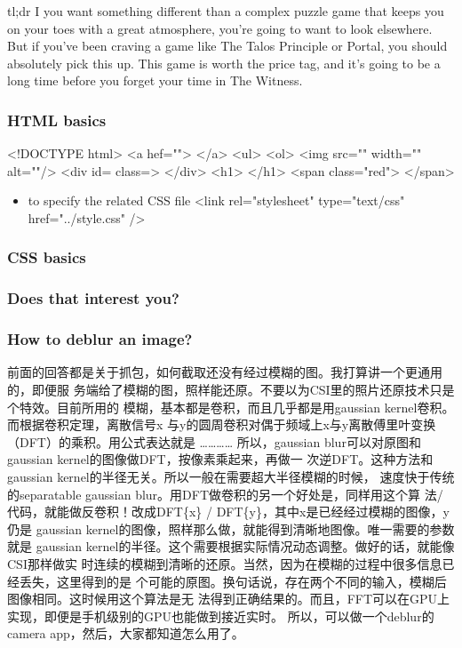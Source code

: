 \documentclass[11pt]{article}
\begin{document}
\begin{itemize}
\begin{itemize}
tl;dr I you want something different than a complex puzzle game that keeps you
on your toes with a great atmosphere, you're going to want to look elsewhere.
But if you've been craving a game like The Talos Principle or Portal, you should
absolutely pick this up. This game is worth the price tag, and it's going to be
a long time before you forget your time in The Witness.
\end{itemize}
\end{itemize}

\subsubsection*{HTML basics}
\label{sec:orgheadline61}
<!DOCTYPE html>
<a hef=""> </a>
<ul>
<ol>
<img src="" width="" alt=""/>
<div id= class=> </div>
<h1> </h1>
<span class="red"> </span>

\begin{itemize}
\item to specify the related CSS file
\label{sec:orgheadline60}
<link rel="stylesheet" type="text/css" href="../style.css" />
\end{itemize}
\subsubsection*{CSS basics}
\label{sec:orgheadline62}

\subsubsection*{Does that \textbf{interest} you?}
\label{sec:orgheadline63}

\subsubsection*{How to deblur an image?}
\label{sec:orgheadline64}

前面的回答都是关于抓包，如何截取还没有经过模糊的图。我打算讲一个更通用的，即便服
务端给了模糊的图，照样能还原。不要以为CSI里的照片还原技术只是个特效。目前所用的
模糊，基本都是卷积，而且几乎都是用gaussian kernel卷积。而根据卷积定理，离散信号x
与y的圆周卷积对偶于频域上x与y离散傅里叶变换（DFT）的乘积。用公式表达就是
\ldots{}\ldots{}\ldots{}\ldots{}
所以，gaussian blur可以对原图和gaussian kernel的图像做DFT，按像素乘起来，再做一
次逆DFT。这种方法和gaussian kernel的半径无关。所以一般在需要超大半径模糊的时候，
速度快于传统的separatable gaussian blur。用DFT做卷积的另一个好处是，同样用这个算
法/代码，就能做反卷积！改成DFT\{x\} / DFT\{y\}，其中x是已经经过模糊的图像，y仍是
gaussian kernel的图像，照样那么做，就能得到清晰地图像。唯一需要的参数就是
gaussian kernel的半径。这个需要根据实际情况动态调整。做好的话，就能像CSI那样做实
时连续的模糊到清晰的还原。当然，因为在模糊的过程中很多信息已经丢失，这里得到的是
个可能的原图。换句话说，存在两个不同的输入，模糊后图像相同。这时候用这个算法是无
法得到正确结果的。而且，FFT可以在GPU上实现，即便是手机级别的GPU也能做到接近实时。
所以，可以做一个deblur的camera app，然后，大家都知道怎么用了。
\end{document}
